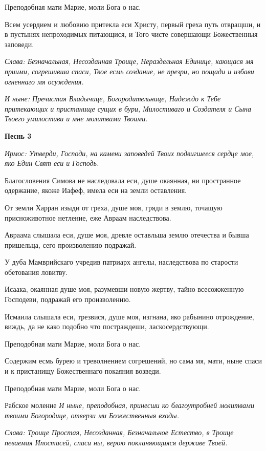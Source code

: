 Преподобная мати Марие, моли Бога о нас. 

Всем усердием и любовию притекла еси Христу, первый греха путь отвращши, и в пустынях непроходимых питающися, и Того чисте совершающи Божественныя заповеди. 

\itshape Слава\normalfont{}: Безначальная, Несозданная Троице, Нераздельная Единице, кающася мя приими, согрешивша спаси, Твое есмь создание, не презри, но пощади и избави огненнаго мя осуждения. 

\itshape И ныне\normalfont{}: Пречистая Владычице, Богородительнице, Надеждо к Тебе притекающих и пристанище сущих в бури, Милостиваго и Создателя и Сына Твоего умилостиви и мне молитвами Твоими.

\medskip\bfseries Песнь 3\normalfont{}

\itshape Ирмос\normalfont{}: Утверди, Господи, на камени заповедей Твоих подвигшееся сердце мое, яко Един Свят еси и Господь. 

Благословения Симова не наследовала еси, душе окаянная, ни пространное одержание, якоже Иафеф, имела еси на земли оставления. 

От земли Харран изыди от греха, душе моя, гряди в землю, точащую присноживотное нетление, еже Авраам наследствова. 

Авраама слышала еси, душе моя, древле оставльша землю отечества и бывша пришельца, сего произволению подражай. 

У дуба Мамврийскаго учредив патриарх ангелы, наследствова по старости обетования ловитву. 

Исаака, окаянная душе моя, разумевши новую жертву, тайно всесожженную Господеви, подражай его произволению. 

Исмаила слышала еси, трезвися, душе моя, изгнана, яко рабынино отрождение, виждь, да не како подобно что постраждеши, ласкосердствующи. 

Преподобная мати Марие, моли Бога о нас. 

Содержим есмь бурею и треволнением согрешений, но сама мя, мати, ныне спаси и к пристанищу Божественнаго покаяния возведи. 

Преподобная мати Марие, моли Бога о нас. 

Рабское моление \itshape И ныне\normalfont{}, преподобная, принесши ко благоутробней молитвами твоими Богородице, отверзи ми Божественныя входы. 

\itshape Слава\normalfont{}: Троице Простая, Несозданная, Безначальное Естество, в Троице певаемая Ипостасей, спаси ны, верою покланяющияся державе Твоей. 

